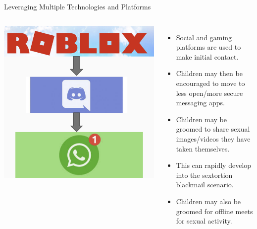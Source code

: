 \documentclass[nobackground,dvipsnames,table,aspectratio=169]{beamer}
\begin{document}
\begin{frame}{Leveraging Multiple Technologies and Platforms }
    \begin{columns}
            \includegraphics[width=\textwidth]{leveraging-multiple-platforms}
            \begin{itemize}
                \item Social and gaming platforms are used to make initial contact.
                \item Children may then be encouraged to move to less open/more secure messaging apps.
                \item Children may be groomed to share sexual images/videos they have taken themselves.
                \item This can rapidly develop into the sextortion blackmail scenario.
                \item Children may also be groomed for offline meets for sexual activity.
            \end{itemize}
    \end{columns}
\end{frame}
\end{document}
